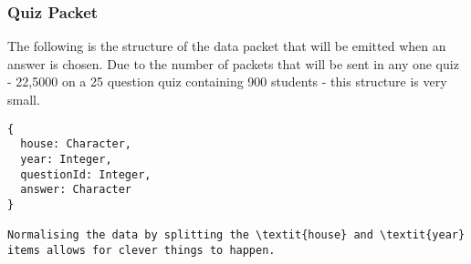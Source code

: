 \subsubsection{Quiz Packet}
The following is the structure of the data packet that will be emitted when an answer is chosen. Due to the number of packets that will be sent in any one quiz - 22,5000 on a 25 question quiz containing 900 students - this structure is very small.

\begin{verbatim}
{
  house: Character,
  year: Integer,
  questionId: Integer,
  answer: Character
}

Normalising the data by splitting the \textit{house} and \textit{year} items allows for clever things to happen. 
\end{verbatim}
